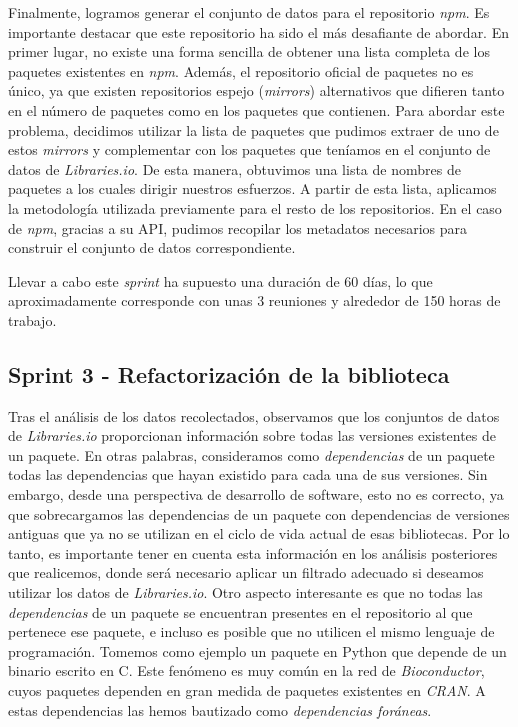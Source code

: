 Finalmente, logramos generar el conjunto de datos para el repositorio \textit{npm}. Es importante destacar que este 
repositorio ha sido el más desafiante de abordar. En primer lugar, no existe una forma sencilla de obtener una lista 
completa de los paquetes existentes en \textit{npm}. Además, el repositorio oficial de paquetes no es único, ya que 
existen repositorios espejo (\textit{mirrors}) alternativos que difieren tanto en el número de paquetes como en los 
paquetes que contienen. Para abordar este problema, decidimos utilizar la lista de paquetes que pudimos extraer de 
uno de estos \textit{mirrors} y complementar con los paquetes que teníamos en el conjunto de datos de \textit{Libraries.io}. 
De esta manera, obtuvimos una lista de nombres de paquetes a los cuales dirigir nuestros esfuerzos. A partir de esta 
lista, aplicamos la metodología utilizada previamente para el resto de los repositorios. En el caso de \textit{npm}, 
gracias a su API, pudimos recopilar los metadatos necesarios para construir el conjunto de datos correspondiente.

Llevar a cabo este \textit{sprint} ha supuesto una duración de 60 días, lo que aproximadamente corresponde con unas 
3 reuniones y alrededor de 150 horas de trabajo.

\subsection{Sprint 3 - Refactorización de la biblioteca}

Tras el análisis de los datos recolectados, observamos que los conjuntos de datos de \textit{Libraries.io} proporcionan 
información sobre todas las versiones existentes de un paquete. En otras palabras, consideramos como \textit{dependencias} 
de un paquete todas las dependencias que hayan existido para cada una de sus versiones. Sin embargo, desde una perspectiva 
de desarrollo de software, esto no es correcto, ya que sobrecargamos las dependencias de un paquete con dependencias de 
versiones antiguas que ya no se utilizan en el ciclo de vida actual de esas bibliotecas. Por lo tanto, es importante tener 
en cuenta esta información en los análisis posteriores que realicemos, donde será necesario aplicar un filtrado adecuado 
si deseamos utilizar los datos de \textit{Libraries.io}.
Otro aspecto interesante es que no todas las \textit{dependencias} de un paquete se encuentran presentes en el repositorio 
al que pertenece ese paquete, e incluso es posible que no utilicen el mismo lenguaje de programación. Tomemos como ejemplo 
un paquete en Python que depende de un binario escrito en C. Este fenómeno es muy común en la red de \textit{Bioconductor}, 
cuyos paquetes dependen en gran medida de paquetes existentes en \textit{CRAN}. 
A estas dependencias las hemos bautizado como \textit{dependencias foráneas}.

